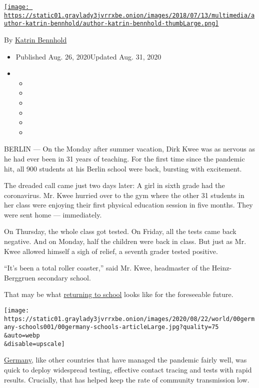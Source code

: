 \href{https://www.nytimes3xbfgragh.onion/by/katrin-bennhold}{\texttt{[image: https://static01.graylady3jvrrxbe.onion/images/2018/07/13/multimedia/author-katrin-bennhold/author-katrin-bennhold-thumbLarge.png]}}

By \href{https://www.nytimes3xbfgragh.onion/by/katrin-bennhold}{Katrin
Bennhold}

\begin{itemize}
\item
  Published Aug. 26, 2020Updated Aug. 31, 2020
\item
  \begin{itemize}
  \item
  \item
  \item
  \item
  \item
  \item
  \end{itemize}
\end{itemize}

BERLIN --- On the Monday after summer vacation, Dirk Kwee was as nervous
as he had ever been in 31 years of teaching. For the first time since
the pandemic hit, all 900 students at his Berlin school were back,
bursting with excitement.

The dreaded call came just two days later: A girl in sixth grade had the
coronavirus. Mr. Kwee hurried over to the gym where the other 31
students in her class were enjoying their first physical education
session in five months. They were sent home --- immediately.

On Thursday, the whole class got tested. On Friday, all the tests came
back negative. And on Monday, half the children were back in class. But
just as Mr. Kwee allowed himself a sigh of relief, a seventh grader
tested positive.

``It's been a total roller coaster,'' said Mr. Kwee, headmaster of the
Heinz-Berggruen secondary school.

That may be what
\href{https://www.nytimes3xbfgragh.onion/2020/08/26/upshot/school-reopening-partisan-divide.html}{returning
to school} looks like for the foreseeable future.

\texttt{[image: https://static01.graylady3jvrrxbe.onion/images/2020/08/22/world/00germany-schools001/00germany-schools-articleLarge.jpg?quality=75\\\&auto=webp\\\&disable=upscale]}

\href{https://www.nytimes3xbfgragh.onion/2020/08/31/world/europe/reichstag-germany-neonazi-coronavirus.html}{Germany},
like other countries that have managed the pandemic fairly well, was
quick to deploy widespread testing, effective contact tracing and tests
with rapid results. Crucially, that has helped keep the rate of
community transmission low.

